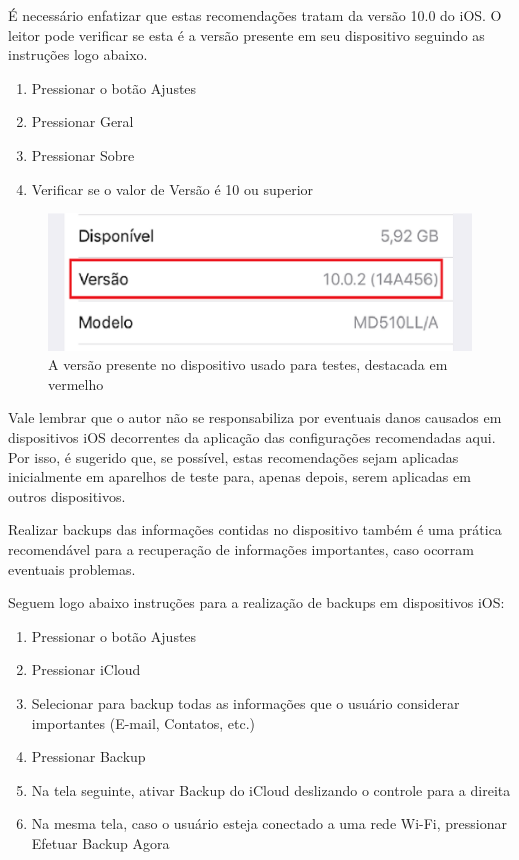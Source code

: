\'E necess\'ario enfatizar que estas recomenda\c c\~oes tratam da vers\~ao 10.0 do iOS. O leitor pode verificar se esta \'e a vers\~ao presente em seu dispositivo seguindo as instru\c c\~oes logo abaixo.

\begin{enumerate}
\item Pressionar o bot\~ao Ajustes
\item Pressionar Geral
\item Pressionar Sobre
\item Verificar se o valor de Vers\~ao \'e 10 ou superior
\end{enumerate}

\begin{figure}[h]
  \centering
  \includegraphics{imagem5.eps}
  \caption{A vers\~ao presente no dispositivo usado para testes, destacada em vermelho}
\end{figure}

Vale lembrar que o autor n\~ao se responsabiliza por eventuais danos causados em dispositivos iOS decorrentes da aplica\c c\~ao das configura\c c\~oes recomendadas aqui. Por isso, \'e sugerido que, se poss\'ivel, estas recomenda\c c\~oes sejam aplicadas inicialmente em aparelhos de teste para, apenas depois, serem aplicadas em outros dispositivos. 

Realizar backups das informa\c c\~oes contidas no dispositivo tamb\'em \'e uma pr\'atica recomend\'avel para a recupera\c c\~ao de informa\c c\~oes importantes, caso ocorram eventuais problemas. 

\pagebreak

Seguem logo abaixo instru\c c\~oes para a realiza\c c\~ao de backups em dispositivos iOS:

\begin{enumerate}
\item Pressionar o bot\~ao Ajustes
\item Pressionar iCloud
\item Selecionar para backup todas as informa\c c\~oes que o usu\'ario considerar importantes (E-mail, Contatos, etc.)
\item Pressionar Backup
\item Na tela seguinte, ativar Backup do iCloud deslizando o controle para a direita
\item Na mesma tela, caso o usu\'ario esteja conectado a uma rede Wi-Fi, pressionar Efetuar Backup Agora   
\end{enumerate}

